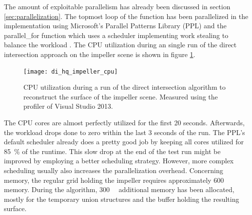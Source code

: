The amount of exploitable parallelism has already been discussed in section \ref{sec:parallelization}.
The topmost loop of the  function has been parallelized in the implementation using Microsoft's Parallel Patterns Library (PPL) and the parallel\_for function which uses a scheduler implementing work stealing to balance the workload \cite{ppl_parallel_for}.
The CPU utilization during an single run of the direct intersection approach on the impeller scene is shown in figure \ref{fig:di_cpu}.
%
\begin{figure}[!]
	\centering
	\texttt{[image: di\_hq\_impeller\_cpu]}
	\caption{
		CPU utilization during a run of the direct intersection algorithm to reconstruct the surface of the impeller scene.
		Measured using the profiler of Visual Studio 2013.
	}
	\label{fig:di_cpu}
\end{figure}
%
The CPU cores are almost perfectly utilized for the first 20 seconds.
Afterwards, the workload drops done to zero within the last 3 seconds of the run.
The PPL's default scheduler already does a pretty good job by keeping all cores utilized for \SI{85}{\percent} of the runtime.
This slow drop at the end of the test run might be improved by employing a better scheduling strategy.
However, more complex scheduling usually also increases the parallelization overhead.
%
Concerning memory, the regular grid holding the impeller requires approximately \SI{600}{\mebi\byte} memory.
During the algorithm, \SI{300}{\mebi\byte} additional memory has been allocated, mostly for the temporary union structures and the buffer holding the resulting surface.

